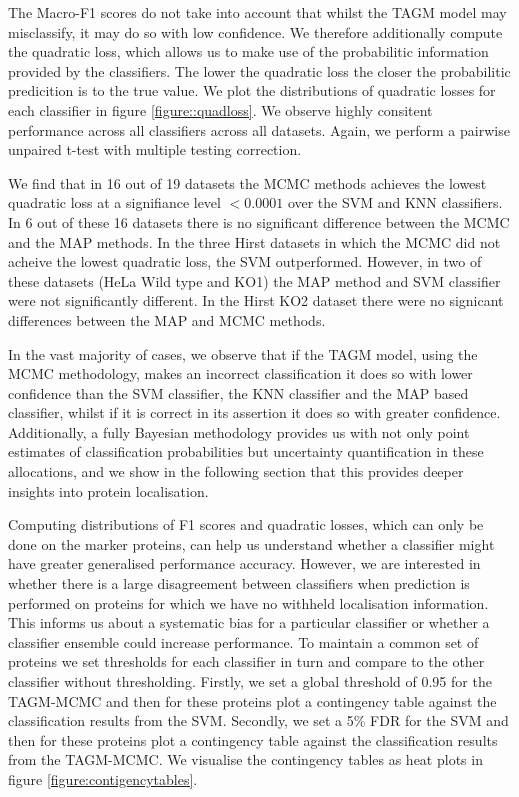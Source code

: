 \documentclass[10pt,letterpaper]{article}\usepackage[]{graphicx}\usepackage[]{color}
\begin{document}
The Macro-F1 scores do not take into account that whilst the TAGM
model may misclassify, it may do so with low confidence. We therefore
additionally compute the quadratic loss, which allows us to make use
of the probabilitic information provided by the classifiers. The lower
the quadratic loss the closer the probabilitic predicition is to the
true value. We plot the distributions of quadratic losses for each
classifier in figure \ref{figure::quadloss}. We observe highly
consitent performance across all classifiers across all
datasets. Again, we perform a pairwise unpaired t-test with multiple
testing correction.

We find that in 16 out of 19 datasets {\color{black}{(all of those except HeLa Wild type,
HeLa KO1 and HeLa KO2)}} the MCMC methods achieves the
lowest quadratic loss at a signifiance level $<0.0001$ over the SVM
and KNN classifiers. In 6 out of these 16 datasets there is no
significant difference between the MCMC and the MAP methods. In the
three Hirst datasets in which the MCMC did not acheive the lowest
quadratic loss, the SVM outperformed. However, in two of these
datasets (HeLa Wild type and KO1) the MAP method and SVM classifier were
not significantly different. In the Hirst KO2 dataset there were no
signicant differences between the MAP and MCMC methods.

In the vast majority of cases, we observe that if the TAGM model,
using the MCMC methodology, makes an incorrect classification it does
so with lower confidence than the SVM classifier, the KNN classifier
and the MAP based classifier, whilst if it is correct in its assertion
it does so with greater confidence. Additionally, a fully Bayesian
methodology provides us with not only point estimates of
classification probabilities but uncertainty quantification in these
allocations, and we show in the following section that this provides
deeper insights into protein localisation.





Computing distributions of F1 scores and quadratic losses, which can
only be done on the marker proteins, can help us understand whether a
classifier might have greater generalised performance
accuracy. However, we are interested in whether there is a large
disagreement between classifiers when prediction is performed on
proteins for which we have no withheld localisation information. This
informs us about a systematic bias for a particular classifier or
whether a classifier ensemble could increase performance. To maintain
a common set of proteins we set thresholds for each classifier in turn
and compare to the other classifier without thresholding. Firstly, we
set a global threshold of 0.95 for the TAGM-MCMC and then for these
proteins plot a contingency table against the classification results
from the SVM. Secondly, we set a 5\% FDR for the SVM and then for
these proteins plot a contingency table against the classification
results from the TAGM-MCMC. We visualise the contingency tables as
heat plots in figure \ref{figure:contigencytables}.
\end{document}
